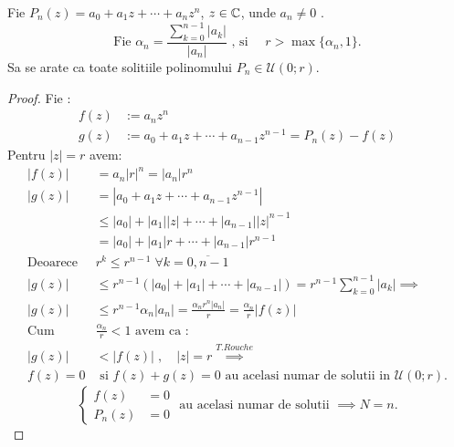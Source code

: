 \begin{aplicatie}
    Fie $P_n(z) = a_0 + a_1 z + \cdots + a_n z^n$, $z \in \mathbb{C}$, unde $a_n \neq 0$ .
    \[
        \text{Fie } \alpha_n = \frac{ \sum_{k=0}^{n-1} |a_k|}{|a_n|}
             \text{ , si } \quad r > \max\{\alpha_n,1\} .
    \]
    Sa se arate ca toate solitiile polinomului $P_n \in \mathcal{U}(0;r)$.
    \begin{proof}
        Fie :
        \begin{align*}
            f(z) &:= a_n z^n \\
            g(z) &:= a_0 + a_1 z + \cdots + a_{n-1}z^{n-1} = P_n(z) - f(z)
        \end{align*}
        Pentru  $|z| = r$ avem:
        \begin{align*}
            |f(z)| &= a_n |r|^n = |a_n| r^n\\
            |g(z)| &= |a_0 + a_1 z + \cdots + a_{n-1}z^{n-1}| \\
                   &\leq |a_0| + |a_1| |z| + \cdots + |a_{n-1}| |z|^{n-1}\\
                   &= |a_0| + |a_1| r + \cdots + |a_{n-1}|r^{n-1}\\
            \text{Deoarece } & r^k \leq r^{n-1}\; \forall k = \overline{0,n-1} \\
            |g(z)| &\leq r^{n-1} (|a_0| + |a_1| + \cdots + |a_{n-1}|)
                = r^{n-1}\sum_{k=0}^{n-1}|a_k| \implies \\
            |g(z)| &\leq r^{n-1} \alpha_n |a_n|
                = \frac{\alpha_n r^n |a_n|}{r} = \frac{\alpha_n}{r} |f(z)| \\
            \text{Cum } & \frac{\alpha_n}{r} < 1 \text{ avem ca : }\\
            |g(z)| & < |f(z)| \;,\quad |z| = r
                \overset{T.Rouche}{\implies}\\
            f(z) = 0 & \text{ si } f(z) + g(z) = 0
                \text{ au acelasi numar de solutii in } \mathcal{U}(0;r) .
        \end{align*}
        \[
            \left \{
                \begin{aligned}
                    f(z) &= 0 \\
                    P_n(z) &= 0
                \end{aligned}
            \right.
            \text{ au acelasi numar de solutii } \implies N = n .
        \]

    \end{proof}
\end{aplicatie}